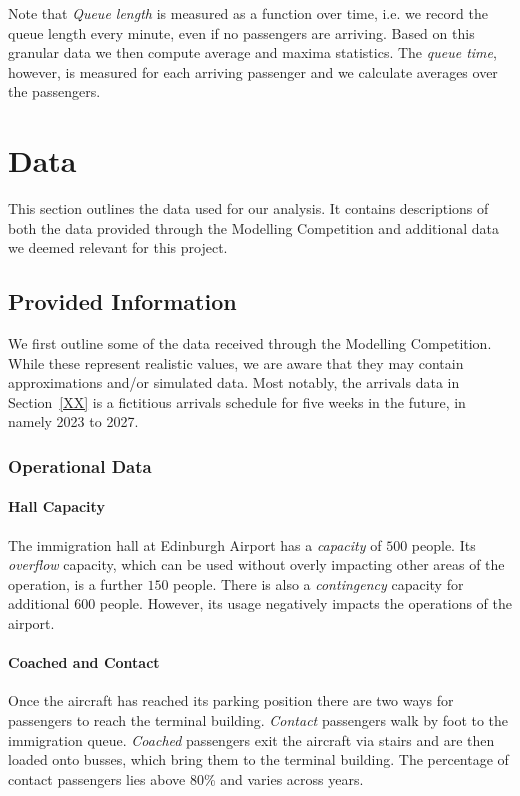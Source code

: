 \documentclass[10pt]{article}
\begin{document}
Note that \textit{Queue length} is measured as a function over time, i.e. we record the queue length every minute, even if no passengers are arriving. Based on this granular data we then compute average and maxima statistics. The \textit{queue time}, however, is measured for each arriving passenger and we calculate averages over the passengers.


\section{Data}
This section outlines the data used for our analysis. It contains descriptions of both the data provided through the Modelling Competition and additional data we deemed relevant for this project.

\subsection{Provided Information}

We first outline some of the data received through the Modelling Competition. While these represent realistic values, we are aware that they may contain approximations and/or simulated data. Most notably, the arrivals data in Section~\ref{XX} is a fictitious arrivals schedule for five weeks in the future, in namely 2023 to 2027. 

\subsubsection{Operational Data}

\paragraph{Hall Capacity}
The immigration hall at Edinburgh Airport has a \textit{capacity} of $500$ people. Its \textit{overflow} capacity, which can be used without overly impacting other areas of the operation, is a further $150$ people. There is also a \textit{contingency} capacity for additional $600$ people. However, its usage negatively impacts the operations of the airport.

\paragraph{Coached and Contact}
Once the aircraft has reached its parking position there are two ways for passengers to reach the terminal building. \textit{Contact} passengers walk by foot to the immigration queue. \textit{Coached} passengers exit the aircraft via stairs and are then loaded onto busses, which bring them to the terminal building. The percentage of contact passengers lies above 80\% and varies across years.
\end{document}
